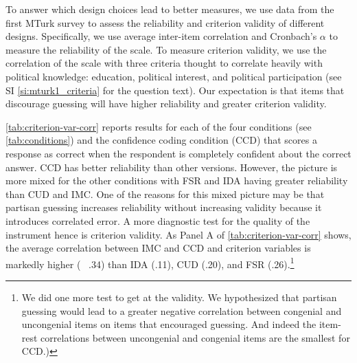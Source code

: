 \documentclass[12pt, letterpaper]{article}
\begin{document}
To answer which design choices lead to better measures, we use data from the first MTurk survey to assess the reliability and criterion validity of different designs. Specifically, we use average inter-item correlation and Cronbach's $\alpha$ to measure the reliability of the scale. To measure criterion validity, we use the correlation of the scale with three criteria thought to correlate heavily with political knowledge: education, political interest, and political participation (see SI \ref{si:mturk1_criteria} for the question text). Our expectation is that items that discourage guessing will have higher reliability and greater criterion validity. 

\cref{tab:criterion-var-corr} reports results for each of the four conditions (see \cref{tab:conditions}) and the confidence coding condition (CCD) that scores a response as correct when the respondent is completely confident about the correct answer. CCD has better reliability than other versions. However, the picture is more mixed for the other conditions with FSR and IDA having greater reliability than CUD and IMC. One of the reasons for this mixed picture may be that partisan guessing increases reliability without increasing validity because it introduces correlated error. A more diagnostic test for the quality of the instrument hence is criterion validity. As Panel A of \cref{tab:criterion-var-corr} shows, the average correlation between IMC and CCD and criterion variables is markedly higher (~ .34) than IDA (.11), CUD (.20), and FSR (.26).\footnote{We did one more test to get at the validity. We hypothesized that partisan guessing would lead to a greater negative correlation between congenial and uncongenial items on items that encouraged guessing. And indeed the item-rest correlations between uncongenial and congenial items are the smallest for CCD.)}
\end{document}
